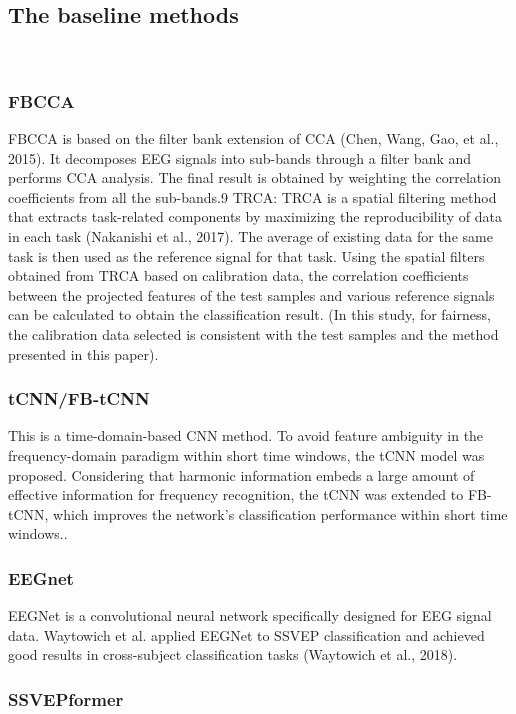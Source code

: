 \documentclass[10pt]{iopart}
\begin{document}
\subsection{The baseline methods}
‌\subsubsection{FBCCA\\}
FBCCA is based on the filter bank extension of CCA (Chen, Wang, Gao, et al., 2015). It decomposes EEG signals into sub-bands through a filter bank and performs CCA analysis. The final result is obtained by weighting the correlation coefficients from all the sub-bands.9
TRCA: TRCA is a spatial filtering method that extracts task-related components by maximizing the reproducibility of data in each task (Nakanishi et al., 2017). The average of existing data for the same task is then used as the reference signal for that task. Using the spatial filters obtained from TRCA based on calibration data, the correlation coefficients between the projected features of the test samples and various reference signals can be calculated to obtain the classification result. (In this study, for fairness, the calibration data selected is consistent with the test samples and the method presented in this paper)\cite{chen2015filter}.
‌\subsubsection{tCNN/FB-tCNN\\}
This is a time-domain-based CNN method. To avoid feature ambiguity in the frequency-domain paradigm within short time windows, the tCNN model was proposed. Considering that harmonic information embeds a large amount of effective information for frequency recognition, the tCNN was extended to FB-tCNN, which improves the network's classification performance within short time windows.\cite{ding2021filter}.
‌\subsubsection{EEGnet\\}
EEGNet is a convolutional neural network specifically designed for EEG signal data. Waytowich et al. applied EEGNet to SSVEP classification and achieved good results in cross-subject classification tasks (Waytowich et al., 2018)\cite{lawhern2018eegnet}.
‌\subsubsection{SSVEPformer\\}
\end{document}
